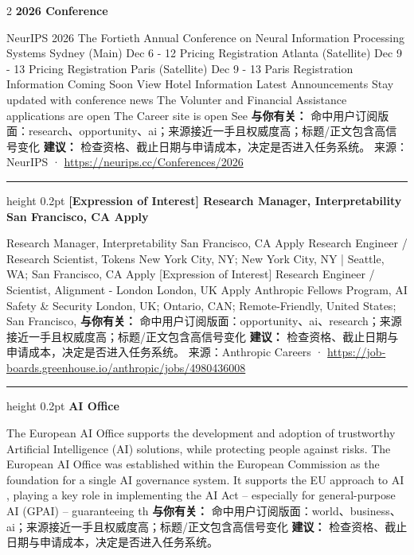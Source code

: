 \documentclass[10.5pt]{ctexart}
\begin{document}
\begin{multicols}{2}
{\large\bfseries 2026 Conference}\par
NeurIPS 2026 The Fortieth Annual Conference on Neural Information Processing Systems Sydney (Main) Dec 6 - 12 Pricing Registration Atlanta (Satellite) Dec 9 - 13 Pricing Registration Paris (Satellite) Dec 9 - 13 Paris Registration Information Coming Soon View Hotel Information Latest Announcements Stay updated with conference news The Volunter and Financial Assistance applications are open The Career site is open See
\textbf{与你有关：} 命中用户订阅版面：research、opportunity、ai；来源接近一手且权威度高；标题/正文包含高信号变化
\textbf{建议：} 检查资格、截止日期与申请成本，决定是否进入任务系统。
{\footnotesize\color{ormuted} 来源：NeurIPS · \url{https://neurips.cc/Conferences/2026}}
\vspace{2mm}
\hrule height 0.2pt
\vspace{2mm}
{\large\bfseries [Expression of Interest] Research Manager, Interpretability San Francisco, CA Apply}\par
[Expression of Interest] Research Manager, Interpretability San Francisco, CA Apply Research Engineer / Research Scientist, Tokens New York City, NY; New York City, NY | Seattle, WA; San Francisco, CA Apply [Expression of Interest] Research Engineer / Scientist, Alignment - London London, UK Apply Anthropic Fellows Program, AI Safety \& Security London, UK; Ontario, CAN; Remote-Friendly, United States; San Francisco, 
\textbf{与你有关：} 命中用户订阅版面：opportunity、ai、research；来源接近一手且权威度高；标题/正文包含高信号变化
\textbf{建议：} 检查资格、截止日期与申请成本，决定是否进入任务系统。
{\footnotesize\color{ormuted} 来源：Anthropic Careers · \url{https://job-boards.greenhouse.io/anthropic/jobs/4980436008}}
\vspace{2mm}
\hrule height 0.2pt
\vspace{2mm}
{\large\bfseries AI Office}\par
The European AI Office supports the development and adoption of trustworthy Artificial Intelligence (AI) solutions, while protecting people against risks. The European AI Office was established within the European Commission as the foundation for a single AI governance system. It supports the EU approach to AI , playing a key role in implementing the AI Act – especially for general-purpose AI (GPAI) – guaranteeing th
\textbf{与你有关：} 命中用户订阅版面：world、business、ai；来源接近一手且权威度高；标题/正文包含高信号变化
\textbf{建议：} 检查资格、截止日期与申请成本，决定是否进入任务系统。

\end{multicols}
\end{document}
